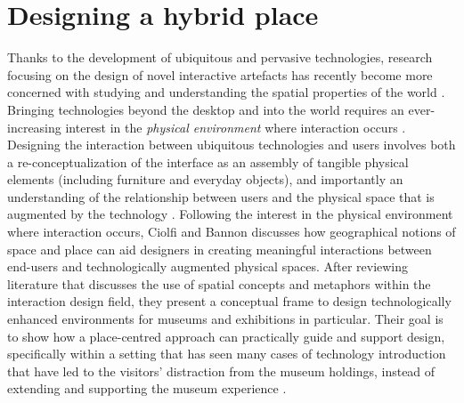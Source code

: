 
\section{Designing a hybrid place}

Thanks to the development of ubiquitous and pervasive technologies, research focusing on the design of novel interactive artefacts has recently become more concerned with studying and understanding the spatial properties of the world \autocite[p. 159]{hybridplace_ciolfi}. Bringing technologies beyond the desktop and into the world requires an ever-increasing interest in the \emph{physical environment} where interaction occurs \autocite[p. 159]{hybridplace_ciolfi}. Designing the interaction between ubiquitous technologies and users involves both a re-conceptualization of the interface as an assembly of tangible physical elements (including furniture and everyday objects), and importantly an understanding of the relationship between users and the physical space that is augmented by the technology \autocite[p. 159]{hybridplace_ciolfi}. Following the interest in the physical environment where interaction occurs, Ciolfi and Bannon discusses how geographical notions of space and place can aid designers in creating meaningful interactions between end-users and technologically augmented physical spaces. After reviewing literature that discusses the use of spatial concepts and metaphors within the interaction design field, they present a conceptual frame to design technologically enhanced environments for museums and exhibitions in particular. Their goal is to show how a place-centred approach can practically guide and support design, specifically within a setting that has seen many cases of technology introduction that have led to the visitors' distraction from the museum holdings, instead of extending and supporting the museum experience \autocite[p. 159-160]{hybridplace_ciolfi}.




